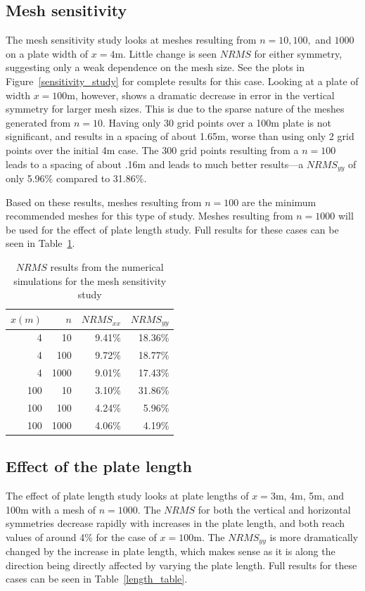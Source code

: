 \documentclass[twocolumn,10pt]{asme2ej}
\begin{document}
\subsection{Mesh sensitivity}
The mesh sensitivity study looks at meshes resulting from $n = 10, 100, $ and $1000$ on a plate width of $x = 4$m. Little change is seen $NRMS$ for either symmetry, suggesting only a weak dependence on the mesh size. See the plots in Figure~\ref{sensitivity_study} for complete results for this case. Looking at a plate of width $x = 100$m, however, shows a dramatic decrease in error in the vertical symmetry for larger mesh sizes. This is due to the sparse nature of the meshes generated from $n = 10$. Having only 30 grid points over a 100m plate is not significant, and results in a spacing of about 1.65m, worse than using only 2 grid points over the initial 4m case. The 300 grid points resulting from a $n = 100$ leads to a spacing of about .16m and leads to much better results---a $NRMS_{yy}$ of only 5.96\% compared to 31.86\%.

Based on these results, meshes resulting from $n = 100$ are the minimum recommended meshes for this type of study. Meshes resulting from $n = 1000$ will be used for the effect of plate length study. Full results for these cases can be seen in Table~\ref{mesh_table}.

\begin{table}[htb]
\begin{center}
\begin{tabular}{|r r | r r|}
\hline
$x (m)$ & $n$ & $NRMS_{xx}$ & $NRMS_{yy}$ \\
\hline
4 & 10   & 9.41\% & 18.36\% \\
4 & 100  & 9.72\% & 18.77\% \\
4 & 1000 & 9.01\% & 17.43\% \\
\hline
100 & 10   & 3.10\% & 31.86\% \\
100 & 100  & 4.24\% & 5.96\% \\
100 & 1000 & 4.06\% & 4.19\% \\
\hline
\end{tabular}
\caption{$NRMS$ results from the numerical simulations for the mesh sensitivity study}
\label{mesh_table}
\end{center}
\end{table}

\subsection{Effect of the plate length}
The effect of plate length study looks at plate lengths of $x = 3$m, 4m, 5m, and 100m with a mesh of $n = 1000$. The $NRMS$ for both the vertical and horizontal symmetries decrease rapidly with increases in the plate length, and both reach values of around 4\% for the case of $x = 100$m. The $NRMS_{yy}$ is more dramatically changed by the increase in plate length, which makes sense as it is along the direction being directly affected by varying the plate length. Full results for these cases can be seen in Table~\ref{length_table}.
\end{document}
